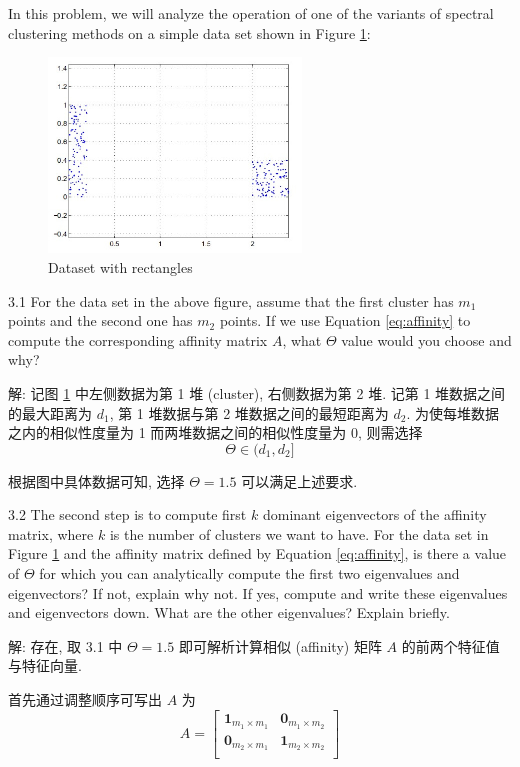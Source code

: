 \documentclass[openany]{ctexbook}
\theoremstyle{kaiti}
\theoremstyle{normal}
\begin{document}
In this problem, we will analyze the operation of one of the variants of spectral clustering methods on a simple data set shown in Figure \ref{fig:f3}:
 \begin{figure}[ht]
  \centering
  \includegraphics[width=0.6\textwidth]{rec_dataset.jpg}
  \caption{Dataset with rectangles} 
  \label{fig:f3}
\end{figure}

3.1 For the data set in the above figure, assume that the first cluster has $m_{1}$ points and the second one has $m_{2}$ points. If we use Equation \ref{eq:affinity} to compute the corresponding affinity matrix $A$, what $\Theta$ value would you choose and why?

解: 记图 \ref{fig:f3} 中左侧数据为第 1 堆 (cluster), 右侧数据为第 2 堆. 记第 1 堆数据之间的最大距离为 $d_1$, 第 1 堆数据与第 2 堆数据之间的最短距离为 $d_2$. 为使每堆数据之内的相似性度量为 1 而两堆数据之间的相似性度量为 0, 则需选择
\begin{equation}
  \Theta\in(d_1,d_2]
\end{equation}

根据图中具体数据可知, 选择 $\Theta=1.5$ 可以满足上述要求.

3.2 The second step is to compute first $k$ dominant eigenvectors of the affinity matrix, where $k$ is the number of clusters we want to have. For the data set in Figure \ref{fig:f3} and the affinity matrix defined by Equation \ref{eq:affinity}, is there a value of $\Theta$ for which you can analytically compute the first two eigenvalues and eigenvectors? If not, explain why not. If yes, compute and write these eigenvalues and eigenvectors down. What are the other eigenvalues? Explain briefly.

解: 存在, 取 3.1 中 $\Theta=1.5$ 即可解析计算相似 (affinity) 矩阵 $A$ 的前两个特征值与特征向量. 

首先通过调整顺序可写出 $A$ 为
\begin{equation}
  A=\begin{bmatrix}
    \bm{1}_{m_1\times m_1} & \bm{0}_{m_1\times m_2} \\
    \bm{0}_{m_2\times m_1} & \bm{1}_{m_2\times m_2} \\
    \end{bmatrix}
\end{equation}
\end{document}

